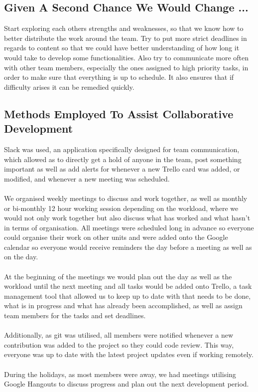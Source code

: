 \documentclass[11pt,a4paper]{article}
\begin{document}
        \subsection{Given A Second Chance We Would Change ...}
        Start exploring each others strengths and weaknesses, so that we know how to better distribute the work around the team. Try to put more strict deadlines in regards to content so that we could have better understanding of how long it would take to develop some functionalities. 
        Also try to communicate more often with other team members, especially the ones assigned to high priority tasks, in order to make sure that everything is up to schedule. It also ensures that if difficulty arises it can be remedied quickly.

        \subsection{Methods Employed To Assist Collaborative Development}
        Slack was used, an application specifically designed for team communication, which allowed as to directly get a hold of anyone in the team, post something important as well as add alerts for whenever a new Trello card was added, or modified, and whenever a new meeting was scheduled. \\ \\
        We organised weekly meetings to discuss and work together, as well as monthly or bi-monthly 12 hour working session depending on the workload, where we would not only work together but also discuss what has worked and what hasn’t in terms of organisation. All meetings were scheduled long in advance so everyone could organise their work on other units and were added onto the Google calendar so everyone would receive reminders the day before a meeting as well as on the day.\\\\
        At the beginning of the meetings we would plan out the day as well as the workload until the next meeting and all tasks would be added onto Trello, a task management tool that allowed us to keep up to date with that needs to be done, what is in progress and what has already been accomplished, as well as assign team members for the tasks and set deadlines.\\\\
        Additionally, as git was utilised, all members were notified whenever a new contribution was added to the project so they could code review. This way, everyone was up to date with the latest project updates even if working remotely. \\\\
        During the holidays, as most members were away, we had meetings utilising Google Hangouts to discuss progress and plan out the next development period. 
\end{document}
